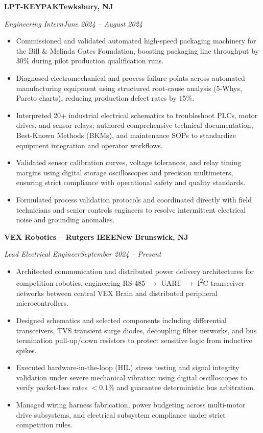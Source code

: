 \documentclass[10pt]{article}
\newcommand{\Company}[2]{\noindent\textbf{#1}\hfill\textbf{#2}\par}
\newcommand{\RoleDates}[2]{\noindent\textit{#1}\hfill\textit{#2}\par}
\begin{document}
\vspace{5.0pt}
\Company{LPT-KEYPAK}{Tewksbury, NJ}
\RoleDates{Engineering Intern}{June 2024 -- August 2024}
\begin{itemize}
  \item Commissioned and validated automated high-speed packaging machinery for the Bill \& Melinda Gates Foundation, boosting packaging line throughput by 30\% during pilot production qualification runs.
  \item Diagnosed electromechanical and process failure points across automated manufacturing equipment using structured root-cause analysis (5-Whys, Pareto charts), reducing production defect rates by 15\%.
  \item Interpreted 20+ industrial electrical schematics to troubleshoot PLCs, motor drives, and sensor relays; authored comprehensive technical documentation, Best-Known Methods (BKMs), and maintenance SOPs to standardize equipment integration and operator workflows.
  \item Validated sensor calibration curves, voltage tolerances, and relay timing margins using digital storage oscilloscopes and precision multimeters, ensuring strict compliance with operational safety and quality standards.
  \item Formulated process validation protocols and coordinated directly with field technicians and senior controls engineers to resolve intermittent electrical noise and grounding anomalies.
\end{itemize}

\vspace{5.0pt}
\Company{VEX Robotics -- Rutgers IEEE}{New Brunswick, NJ}
\RoleDates{Lead Electrical Engineer}{September 2024 -- Present}
\begin{itemize}
  \item Architected communication and distributed power delivery architectures for competition robotics, engineering RS-485 $\rightarrow$ UART $\rightarrow$ I\textsuperscript{2}C transceiver networks between central VEX Brain and distributed peripheral microcontrollers.
  \item Designed schematics and selected components including differential transceivers, TVS transient surge diodes, decoupling filter networks, and bus termination pull-up/down resistors to protect sensitive logic from inductive spikes.
  \item Executed hardware-in-the-loop (HIL) stress testing and signal integrity validation under severe mechanical vibration using digital oscilloscopes to verify packet-loss rates $<0.1\%$ and guarantee deterministic bus arbitration.
  \item Managed wiring harness fabrication, power budgeting across multi-motor drive subsystems, and electrical subsystem compliance under strict competition rules.
\end{itemize}
\end{document}
